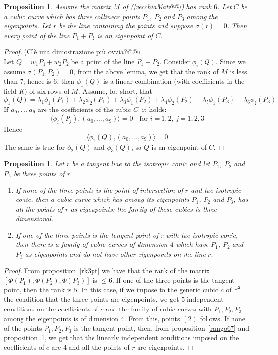 \documentclass{amsart}
\theoremstyle{plain}
\newtheorem{prop}[theorem]{Proposition}
\theoremstyle{definition}
\newcommand{\scl}[2]{\langle #1, #2 \rangle}
\begin{document}
\begin{prop}
  Assume the matrix $M$ of (\ref{vecchiaMat@@}) has rank $6$. Let $C$ be a
  cubic curve which has three collinear points $P_1$, $P_2$
  and $P_3$ among the eigenpoints. Let $r$ be the line containing the
  points and suppose $\sigma(r) = 0$.
  Then every point of the line $P_1+P_2$ is an eigenpoint of $C$.
  \label{rettaAutop}
\end{prop}
\begin{proof}
(C'\`e una dimostrazione pi\`u ovvia?@@)\\
  Let $Q = w_1P_1+w_2P_2$ be a point of the line $P_1+P_2$. Consider $\phi_i(Q)$.
  Since we assume $\sigma(P_1, P_2)=0$, from the above lemma, we get that
  the rank of $M$ is less than $7$, hence is $6$, then $\phi_1(Q)$
  is a linear combination (with coefficients in the field $K$)
  of six rows of $M$. Assume, for short, that 
  \[
  \phi_1(Q) = \lambda_1\phi_1(P_1)+\lambda_2\phi_2(P_1)+
  \lambda_3\phi_1(P_2)+\lambda_4\phi_2(P_2)+
  \lambda_5\phi_1(P_3)+\lambda_6\phi_2(P_3)
  \]
  If $a_0, \dots, a_9$
  are the coefficients of the cubic $C$, it holds:
  \[
  \scl{\phi_i(P_j)}{(a_0, \dots, a_9)} = 0 \quad \mbox{for $i=1, 2$,
    $j=1, 2, 3$}
  \]
  Hence
  \[
  \scl{\phi_1(Q)}{(a_0, \dots, a_9)} = 0
  \]
  The same is true for $\phi_2(Q)$ and $\phi_3(Q)$, so $Q$ is an
  eigenpoint of $C$.
\end{proof}

\begin{prop}
  Let $r$ be a tangent line to the isotropic conic and let
  $P_1$, $P_2$ and $P_3$ be three points of $r$.
  \begin{enumerate}
    \item If none of the three points is the point of intersection of
      $r$ and the isotropic conic, then a cubic curve which has among
      its eigenpoints $P_1$, $P_2$ and $P_3$, has all the points of
      $r$ as eigenpoints; the family of these cubics is three dimensional.      
    \item If one of the three points is the tangent point of $r$ with
      the isotropic conic, then there is a family of cubic curves
      of dimension $4$ which have $P_1$, $P_2$ and $P_3$ as eigenpoints
      and do not have other eigenpoints on the line $r$.
  \end{enumerate}
\end{prop}
\begin{proof}
  {}From proposition~\ref{rk3pt} we have that the rank of the matrix
  $[\Phi(P_1), \Phi(P_2), \Phi(P_3)]$ is $\leq 6$. If one of the
  three points is the tangent point, then the rank is $5$. In this case, if
  we impose to the generic cubic $c$ of $\mathbb{P}^2$ the condition that
  the three points are eigenpoints, we get $5$ independent conditions on
  the coefficients of $c$ and the family of cubic curves with $P_1, P_2, P_3$
  among the eigenpoints is of dimension $4$. From this, points $(2)$
  follows. If none of the points $P_1, P_2, P_3$ is the tangent point,
  then, from proposition~\ref{rango67} and proposition~\ref{rettaAutop},
  we get that the linearly independent conditions imposed on the
  coefficients of $c$ are $4$ and all the points of $r$ are eigenpoints.
  \end{proof}
\end{document}
